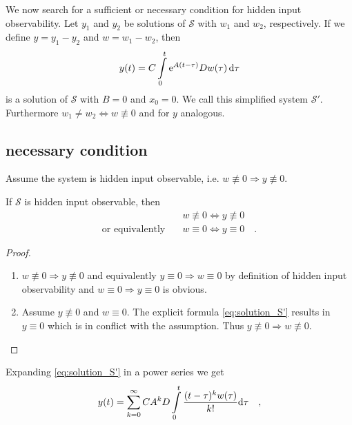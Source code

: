 We now search for a sufficient or necessary condition for hidden input observability. 
Let $y_1$ and $y_2$ be solutions of $\mathcal{S}$ with $w_1$ and $w_2$, respectively. If 
we define $y=y_1-y_2$ and $w=w_1-w_2$, then
\begin{equation}
y(t) = C \int\limits_0^t \text{e}^{A(t-\tau)}D w(\tau) \,\text{d} \tau \label{eq:solution_S'}
\end{equation}
is a solution of $\mathcal{S}$ with $B=0$ and $x_0=0$. We call this simplified system 
$\mathcal{S}'$. Furthermore $w_1 \neq w_2 
\Leftrightarrow w\not\equiv 0$ and for $y$ analogous.

\subsection{necessary condition}
Assume the system is hidden input observable, i.e. $w\not\equiv 0 \Rightarrow 
y\not\equiv 0$. 
\begin{lemma}
If $\mathcal{S}$ is hidden input observable, then 
\begin{align}
&w\not\equiv 0 \Leftrightarrow y\not\equiv 0 \\
\text{or equivalently} \quad & w \equiv 0 \Leftrightarrow y\equiv 0 \quad .
\end{align}
\end{lemma}
\begin{proof}
\begin{enumerate}
\item $w\not\equiv 0 \Rightarrow y\not\equiv 0$ and equivalently $y\equiv 0 \Rightarrow 
w\equiv 0$ by definition of hidden input 
observability and $w\equiv 0 \Rightarrow y\equiv 0$ is obvious.
\item Assume $y\not\equiv 0$ and $w \equiv 0$. The explicit formula 
\eqref{eq:solution_S'} results in $y\equiv 0$ which is in conflict with the assumption. 
Thus $y\not\equiv 0 \Rightarrow w \not\equiv 0$.
\end{enumerate} 
\end{proof}
Expanding \eqref{eq:solution_S'} in a power series we get
\begin{equation}
y(t) = \sum\limits_{k=0}^\infty CA^kD \int\limits_0^t\frac{(t-\tau)^kw(\tau)}{k!} \text{d} 
\tau \quad ,
\end{equation}
